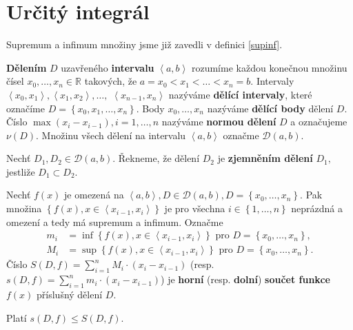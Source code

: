 \section{Určitý integrál}
\begin{pozn}
    Supremum a infimum množiny jsme již zavedli v definici \ref{supinf}.
\end{pozn}

\begin{definition}
\textbf{Dělením} $D$ uzavřeného \textbf{intervalu} $\left < a,b \right > $
rozumíme každou konečnou množinu čísel $x_0,\dots,x_n \in \mathbb R$ takových, že
$a=x_0<x_1<\dots<x_n=b.$ Intervaly $\left < x_0, x_1 \right > ,
\left < x_1, x_2 \right >, \dots,$ $\left < x_{n-1}, x_n \right >  $ nazýváme
\textbf{dělící intervaly}, které označíme $D=\left \{ x_0,x_1,\dots,x_n \right \} .$
Body $x_0,\dots,x_n$ nazýváme \textbf{dělící body} dělení $D$. Číslo
$\max \left ( x_i-x_{i-1} \right ), i=1,\dots,n $ nazýváme \textbf{normou dělení}
$D$ a označujeme $\nu(D).$ Množinu všech dělení na intervalu $\left < a,b \right > $
označme $\mathscr D(a,b).$
\end{definition}

\begin{definition}
Nechť $D_1, D_2 \in \mathscr D(a,b)$. Řekneme, že dělení $D_2$ je \textbf{zjemněním
dělení} $D_1,$ jestliže $D_1 \subset D_2.$
\end{definition}

\begin{definition}
Nechť $f(x)$ je omezená na $\left < a,b \right > , D\in \mathscr D(a,b),
D=\left \{ x_0,\dots,x_n \right \}. $ Pak množina $\left \{ f(x),
x \in \left < x_{i-1},x_i \right >  \right \} $ je pro všechna $i \in \left \{
1,\dots,n\right \} $ neprázdná a omezení a tedy má supremum a infimum.
Označme
\begin{align*}
    m_i &= \inf \left \{ f(x), x \in \left < x_{i-1},x_i \right >  \right \} \textrm{ pro } D=\left \{ x_0,\dots,x_n \right \},\\
    M_i &=   \sup \left \{ f(x), x \in \left < x_{i-1},x_i \right >  \right \} \textrm{ pro } D=\left \{ x_0,\dots,x_n \right \}.
\end{align*}
Číslo $S(D,f)=\sum_{i=1}^n M_i\cdot (x_i-x_{i-1})$
(resp. $s(D,f)=\sum_{i=1}^n m_i\cdot (x_i-x_{i-1})$) je \textbf{horní} (resp. \textbf{dolní}) \textbf{součet funkce}
$f(x)$ příslušný dělení $D$.
\end{definition}

\begin{pozn}
    Platí $s(D,f)\leq S(D,f).$
\end{pozn}

